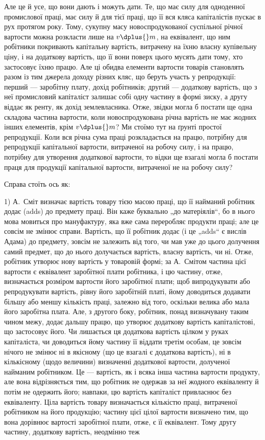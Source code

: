 \parcont{}  %
Але це й усе, що вони дають і можуть дати. Те, що має силу для одноденної промислової праці, має
силу й для тієї праці, що її вся кляса капіталістів пускає в рух протягом року. Тому, сукупну масу
новоспродукованої суспільної річної вартости можна розкласти лише на $v \dplus{} m$, на еквівалент, що ним
робітники покривають капітальну вартість, витрачену на їхню власну купівельну ціну, і на додаткову
вартість, що її вони поверх цього мусять дати тому, хто застосовує їхню працю. Але ці обидва
елементи вартости товарів становлять разом із тим джерела доходу різних кляс, що беруть участь у
репродукції: перший — заробітну плату, дохід робітників; другий — додаткову вартість, що з неї
промисловий капіталіст залишає собі одну частину в формі зиску, а другу віддає як ренту, як дохід
землевласника. Отже, звідки могла б постати ще одна складова частина вартости, коли новоспродукована
річна вартість не має жодних інших елементів, крім $v \dplus{} m$? Ми стоїмо тут на ґрунті простої
репродукції. Коли вся річна сума праці розкладається на працю, потрібну для репродукції капітальної
вартости, витраченої на робочу силу, і на працю, потрібну для утворення додаткової вартости, то
відки ще взагалі могла б постати праця для продукції капітальної вартости, витраченої не на робочу
силу?

Справа стоїть ось як:

1) А.~Сміт визначає вартість товару тією масою праці, що її найманий робітник додає (adds) до
предмету праці. Він каже буквально „до матеріялів“, бо в нього мова мовиться про мануфактуру, яка
вже сама переробляє продукти праці; але це совсім не змінює справи. Вартість, що її робітник додає
(і це „adds“ є вислів Адама) до предмету, зовсім
не залежить від того, чи мав уже до цього долучення самий предмет, що до нього долучається вартість,
власну вартість, чи ні. Отже, робітник утворює нову вартість у товаровій формі; за А.~Смітом частина
цієї вартости є еквівалент заробітної плати робітника, і цю частину, отже, визначається розміром
вартости його заробітної плати; щоб випродукувати або репродукувати вартість, рівну його заробітній
платі, йому
доводиться додавати більшу або меншу кількість праці, залежно від того, оскільки велика або мала
його заробітна плата. Але, з другого боку, робітник, понад визначувану таким чином межу, додає
дальшу працю, що утворює додаткову вартість капіталістові, що застосовує його. Чи лишається ця
додаткова вартість цілком у руках капіталіста, чи доводиться йому частину її віддати третім особам,
це зовсім нічого не змінює ні в якісному (що це взагалі є додаткова вартість), ні в кількісному
(щодо величини) визначенні додаткової вартости, долученої найманим робітником. Це — вартість, як і
всяка інша частина вартости продукту, але вона відрізняється тим, що робітник не одержав за неї
жодного еквіваленту й потім не одержить його; навпаки, цю вартість капіталіст привласнює без
еквіваленту. Ціла вартість товару визначається кількістю
праці, витраченої робітником на його продукцію; частину цієї цілої вартости визначено тим, що вона
дорівнює вартості заробітної плати, отже, є її еквівалент. Тому другу частину, додаткову вартість,
неодмінно теж
\parbreak{}  %
